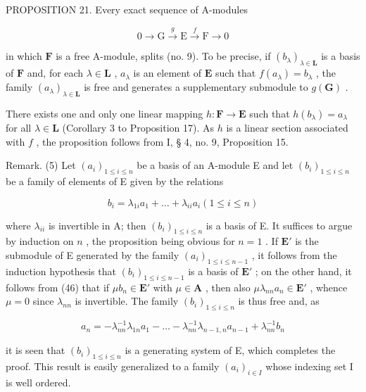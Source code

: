 PROPOSITION 21. Every exact sequence of A-modules

\[
0 \longrightarrow \mathrm{G} \stackrel {g} {\longrightarrow} \mathrm{E} \stackrel {f} {\longrightarrow} \mathrm{F} \longrightarrow 0
\]

in which \(\mathbf{F}\) is a free A-module, splits (no. 9). To be precise, if \((b_{\lambda})_{\lambda \in \mathbf{L}}\) is a basis of \(\mathbf{F}\) and, for each \(\lambda \in \mathbf{L}\) , \(a_{\lambda}\) is an element of \(\mathbf{E}\) such that \(f(a_{\lambda}) = b_{\lambda}\) , the family \((a_{\lambda})_{\lambda \in \mathbf{L}}\) is free and generates a supplementary submodule to \(g(\mathbf{G})\) .

There exists one and only one linear mapping \(h: \mathbf{F} \to \mathbf{E}\) such that \(h(b_{\lambda}) = a_{\lambda}\) for all \(\lambda \in \mathbf{L}\) (Corollary 3 to Proposition 17). As \(h\) is a linear section associated with \(f\) , the proposition follows from I, § 4, no. 9, Proposition 15.

Remark. (5) Let \((a_{i})_{1\leqslant i\leqslant n}\) be a basis of an A-module E and let \((b_{i})_{1\leqslant i\leqslant n}\) be a family of elements of E given by the relations

\[
b _ {i} = \lambda_ {1 i} a _ {1} + \dots + \lambda_ {i i} a _ {i} (1 \leqslant i \leqslant n)\tag{46}
\]

where \(\lambda_{ii}\) is invertible in A; then \((b_i)_{1\leqslant i\leqslant n}\) is a basis of E. It suffices to argue by induction on \(n\) , the proposition being obvious for \(n = 1\) . If \(\mathbf{E}'\) is the submodule of E generated by the family \((a_i)_{1\leqslant i\leqslant n - 1}\) , it follows from the induction hypothesis that \((b_i)_{1\leqslant i\leqslant n - 1}\) is a basis of \(\mathbf{E}'\) ; on the other hand, it follows from (46) that if \(\mu b_n\in \mathbf{E}'\) with \(\mu \in \mathbf{A}\) , then also \(\mu \lambda_{nn}a_n\in \mathbf{E}'\) , whence \(\mu = 0\) since \(\lambda_{nn}\) is invertible. The family \((b_i)_{1\leqslant i\leqslant n}\) is thus free and, as

\[
a _ {n} = - \lambda_ {n n} ^ {- 1} \lambda_ {1 n} a _ {1} - \dots - \lambda_ {n n} ^ {- 1} \lambda_ {n - 1, n} a _ {n - 1} + \lambda_ {n n} ^ {- 1} b _ {n}
\]

it is seen that \((b_{i})_{1\leqslant i\leqslant n}\) is a generating system of E, which completes the proof. This result is easily generalized to a family \((a_{i})_{i\in I}\) whose indexing set I is well ordered.
\relax{}
